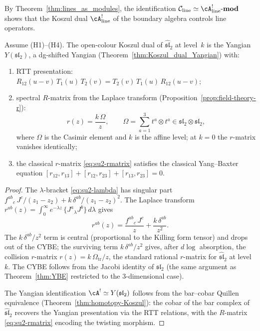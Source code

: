 By Theorem~\ref{thm:lines_as_modules}, the identification
$\mathcal{C}_{\mathrm{line}} \simeq \cA^!_{\mathrm{line}}\text{-}\mathbf{mod}$
shows that the Koszul dual
$\cA^!_{\mathrm{line}}$ of the boundary algebra controls line operators.

\begin{theorem}
Assume \textrm{(H1)--(H4)}. The open-colour Koszul dual of
$\widehat{\mathfrak{sl}}_2$ at level~$k$ is the Yangian
$Y(\mathfrak{sl}_2)$, a dg-shifted Yangian
(Theorem~\ref{thm:Koszul_dual_Yangian}) with:
\begin{enumerate}[label=\textup{(\roman*)}]
\item RTT presentation: $R_{12}(u-v)\, T_1(u)\, T_2(v)
 = T_2(v)\, T_1(u)\, R_{12}(u-v)$;
\item spectral $R$-matrix from the Laplace transform
 (Proposition~\ref{prop:field-theory-r}):
 \begin{equation}%
 r(z) = \frac{k\,\Omega}{z},
 \qquad
 \Omega = \sum_{a=1}^3 t^a \otimes t^a
 \in \mathfrak{sl}_2 \otimes \mathfrak{sl}_2,
 \end{equation}
 where $\Omega$ is the Casimir element and $k$ is the affine level; at $k = 0$ the $r$-matrix vanishes identically;
\item the classical $r$-matrix \eqref{eq:su2-rmatrix} satisfies
 the classical Yang--Baxter equation
 $[r_{12}, r_{13}] + [r_{12}, r_{23}] + [r_{13}, r_{23}] = 0$.
\end{enumerate}
\end{theorem}

\begin{proof}
The $\lambda$-bracket \eqref{eq:su2-lambda} has singular part
$f^{ab}{}_c\, J^c / (z_1 - z_2) + k\, \delta^{ab} / (z_1 - z_2)^2$.
The Laplace transform
$r^{ab}(z) = \int_0^\infty e^{-\lambda z}\, \{J^a{}_\lambda J^b\}\, d\lambda$
gives
\[
r^{ab}(z) = \frac{f^{ab}{}_c\, J^c}{z} + \frac{k\, \delta^{ab}}{z^2}.
\]
The $k\,\delta^{ab}/z^2$ term is central (proportional to the Killing
form tensor) and drops out of the CYBE\@; the surviving term
$k\,\delta^{ab}/z^2$ gives, after $d\log$ absorption, the collision $r$-matrix $r(z) = k\,\Omega_{\mathrm{tr}}/z$, the standard rational
$r$-matrix for $\widehat{\mathfrak{sl}}_2$ at level~$k$. The CYBE follows from the
Jacobi identity of $\mathfrak{sl}_2$ (the same argument as
Theorem~\ref{thm:YBE} restricted to the $3$-dimensional case).

The Yangian identification
$\cA^! \simeq Y(\mathfrak{sl}_2)$ follows from the
bar--cobar Quillen equivalence
(Theorem~\ref{thm:homotopy-Koszul}): the cobar of the bar
complex of $\widehat{\mathfrak{sl}}_2$ recovers the Yangian
presentation via the RTT relations, with the $R$-matrix
\eqref{eq:su2-rmatrix} encoding the twisting morphism.
\end{proof}

